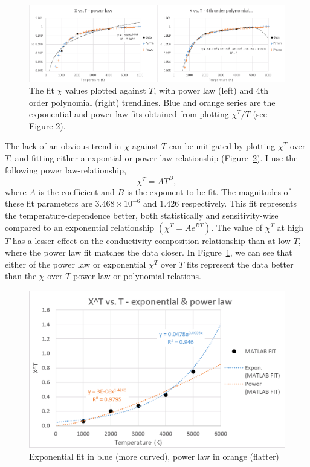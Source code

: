 \begin{figure}[h!]
  \includegraphics[width=\linewidth]{Figures/draft_XT.png}
  \caption{The fit $\chi$ values plotted against $T$, with power law (left) and 4th order polynomial (right) trendlines. Blue and orange series are the exponential and power law fits obtained from plotting $\chi^T/T$ (see Figure \ref{fig:draft_xtt}).}
  \label{fig:draft_xt}
\end{figure}

The lack of an obvious trend in $\chi$ against $T$ can be mitigated by plotting $\chi^T$ over $T$, and fitting either a expontial or power law relationship (Figure~\ref{fig:draft_xtt}). I use the following power law-relationship, 
%
\begin{equation}%
\chi^{T}=A T^{B},
\label{eq.chi_scale}
\end{equation}%
%
where $A$ is the coefficient and $B$ is the exponent to be fit. The magnitudes of these fit parameters are $3.468 \times 10^{-6}$ and $1.426$ respectively. This fit represents the temperature-dependence better, both statistically and sensitivity-wise compared to an exponential relationship $\left ( \chi^{T}=A e^{BT}\right )$. The value of $\chi^T$ at high $T$ has a lesser effect on the conductivity-composition relationship than at low $T$, where the power law fit matches the data closer. In Figure~\ref{fig:draft_xt}, we can see that either of the power law or exponential $\chi^T$ over $T$ fits represent the data better than the $\chi$ over $T$ power law or polynomial relations.

\begin{figure}[h]
  \includegraphics[width=\linewidth]{Figures/draft_XTT.png}
  \caption{Exponential fit in blue (more curved), power law in orange (flatter)}
  \label{fig:draft_xtt}
\end{figure}

